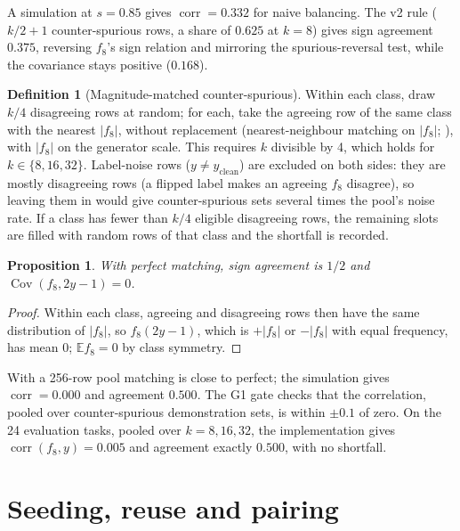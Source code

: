 \documentclass[11pt,a4paper]{article}
\newcommand{\1}{\mathbf{1}}
\newcommand{\E}{\mathbb{E}}
\DeclareMathOperator{\corr}{corr}
\DeclareMathOperator{\Cov}{Cov}
\theoremstyle{plain}
\newtheorem{proposition}[theorem]{Proposition}
\theoremstyle{definition}
\newtheorem{definition}[theorem]{Definition}
\theoremstyle{remark}
\newcommand{\status}[1]{\par\noindent\hfill\fcolorbox{black!35}{black!4}{\scriptsize\sffamily Status: #1}\par\medskip}
\begin{document}
A simulation at $s = 0.85$ gives $\corr = 0.332$ for naive balancing. The v2
rule ($k/2 + 1$ counter-spurious rows, a share of $0.625$ at $k=8$) gives
sign agreement $0.375$, reversing $f_8$'s sign relation and mirroring the
spurious-reversal test, while the covariance stays positive ($0.168$).

\begin{definition}[Magnitude-matched counter-spurious]
Within each class, draw $k/4$ disagreeing rows at random; for each, take
the agreeing row of the same class with the nearest $|f_8|$, without
replacement (nearest-neighbour matching on $|f_8|$;
\citealp{rubin1973matching,stuart2010matching}), with $|f_8|$ on the
generator scale. This requires $k$ divisible by 4, which holds for
$k \in \{8, 16, 32\}$. Label-noise rows ($y \neq y_{\mathrm{clean}}$) are
excluded on both sides: they are mostly disagreeing rows (a flipped label
makes an agreeing $f_8$ disagree), so leaving them in would give
counter-spurious sets several times the pool's noise rate. If a class has
fewer than $k/4$ eligible disagreeing rows, the remaining slots are filled
with random rows of that class and the shortfall is recorded.
\end{definition}

\begin{proposition}
With perfect matching, sign agreement is $1/2$ and
$\Cov(f_8, 2y-1) = 0$.
\end{proposition}
\begin{proof}
Within each class, agreeing and disagreeing rows then have the same
distribution of $|f_8|$, so $f_8(2y-1)$, which is $+|f_8|$ or $-|f_8|$ with
equal frequency, has mean 0; $\E f_8 = 0$ by class symmetry.
\end{proof}

With a 256-row pool matching is close to perfect; the simulation gives
$\corr = 0.000$ and agreement $0.500$. The G1 gate checks that the
correlation, pooled over counter-spurious demonstration sets, is within
$\pm 0.1$ of zero. On the 24 evaluation tasks, pooled over $k = 8, 16, 32$,
the implementation gives $\corr(f_8, y) = 0.005$ and agreement exactly
$0.500$, with no shortfall.

\section{Seeding, reuse and pairing}
\label{sec:seeding}
\status{Implemented (P1)}
\end{document}
